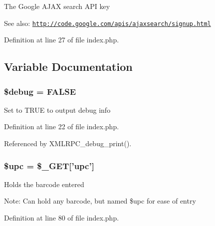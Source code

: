 The Google AJAX search API key \begin{Desc}
\item[See also:]\href{http://code.google.com/apis/ajaxsearch/signup.html}{\tt http://code.google.com/apis/ajaxsearch/signup.html} \end{Desc}


Definition at line 27 of file index.php.

\subsection{Variable Documentation}
\hypertarget{index_8php_85ae3e64cd40e9564adceb010085e9dd}{
\subsubsection{\setlength{\rightskip}{0pt plus 5cm}\$debug = FALSE}}
\label{index_8php_85ae3e64cd40e9564adceb010085e9dd}


Set to TRUE to output debug info 

Definition at line 22 of file index.php.

Referenced by XMLRPC\_\-debug\_\-print().\hypertarget{index_8php_a9aa17ff51d69075d75cfc5bc4e89b34}{
\subsubsection{\setlength{\rightskip}{0pt plus 5cm}\$upc = \$\_\-GET\mbox{[}'upc'\mbox{]}}}
\label{index_8php_a9aa17ff51d69075d75cfc5bc4e89b34}


Holds the barcode entered \begin{Desc}
\item[Note:]Can hold any barcode, but named \$upc for ease of entry \end{Desc}


Definition at line 80 of file index.php.